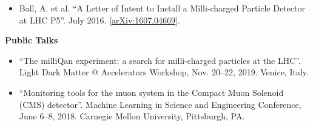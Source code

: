 \begin{vitae}
\begin{itemize}
\item Ball, A. et al. ``A Letter of Intent to Install a Milli-charged Particle Detector at LHC P5''. July 2016.
  [\href{https://arxiv.org/abs/1607.04669}{arXiv:1607.04669}].

\end{itemize}


\vspace{0.2cm}
\textbf{Public Talks}

\begin{itemize}

\item ``The milliQan experiment: a search for milli-charged particles at the LHC''.
Light Dark Matter @ Accelerators Workshop, Nov. 20--22, 2019. Venice, Italy.

\item ``Monitoring tools for the muon system in the Compact Muon Solenoid (CMS) detector''.
Machine Learning in Science and Engineering Conference, June 6--8, 2018. Carnegie Mellon
University, Pittsburgh, PA.

\end{itemize}

\end{vitae}
